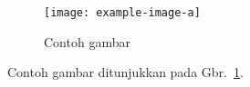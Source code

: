 \documentclass{article}
\begin{document}
\begin{figure}[!hb]
	\centering
	\texttt{[image: example-image-a]}
	\caption{Contoh gambar}
	\label{fig:main}
\end{figure}

Contoh gambar ditunjukkan pada Gbr.~\ref{fig:main}. 
\end{document}
